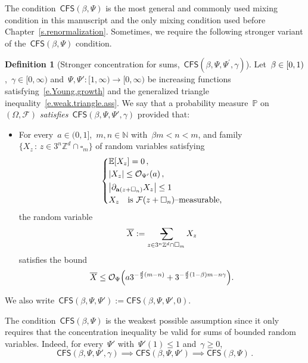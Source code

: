 \documentclass[11pt,twoside]{article} %
\makeatletter
\let\oldsquare\square %
\renewcommand{\square}{\oldsquare}
\numberwithin{equation}{section}
\theoremstyle{definition}
\newtheorem{definition}[theorem]{Definition}
\let\originalleft\left
\let\originalright\right
\renewcommand{\left}{\mathopen{}\mathclose\bgroup\originalleft}
\renewcommand{\right}{\aftergroup\egroup\originalright}
\newcommand*{\N}{\ensuremath{\mathbb{N}}}
\newcommand*{\Zd}{\ensuremath{\mathbb{Z}^d}}
\renewcommand{\a}{\mathbf{a}}
\newcommand{\cu}{\square}
\newcommand{\F}{\mathcal{F}}
\renewcommand{\P}{\mathbb{P}}
\newcommand{\E}{\mathbb{E}}
\renewcommand{\O}{\mathcal{O}}
\newcommand{\avsum}{\mathop{\mathpalette\avsuminner\relax}\displaylimits}
\newcommand\avsuminner[2]{%
  {\sbox0{$\m@th#1\sum$}%
   \vphantom{\usebox0}%
   \ooalign{%
     \hidewidth
     \smash{\,\rule[.23em]{8.8pt}{1.1pt} \relax}%
     \hidewidth\cr
   ~$\m@th#1\sum$\cr
   }%
  }%
}
\newcommand{\CFS}{\mathsf{CFS}}
\makeatother
\begin{document}
The condition~$\CFS(\beta,\Psi)$ is the most general and commonly used mixing condition in this manuscript and the only mixing condition used before Chapter~\ref{s.renormalization}. 
Sometimes, we require the following stronger variant of the~$\CFS(\beta,\Psi)$ condition. 
\begin{definition}[Stronger concentration for sums,~$\CFS(\beta,\Psi,\Psi^\prime,\gamma)$] \hspace{-2pt} 
\label{d.CFS.strong}
Let~$\beta \in \left[0,1\right)$,~$\gamma\in [0,\infty)$ and~$\Psi,\Psi':[1,\infty) \to [0,\infty)$ be increasing functions satisfying~\eqref{e.Young.growth} and the generalized triangle inequality~\eqref{e.weak.triangle.ass}.
We say that a probability measure~$\P$ on~$(\Omega,\F)$ \emph{satisfies~$\CFS(\beta,\Psi,\Psi',\gamma)$} provided that: 
\begin{itemize}
\item
For every~$a\in (0,1]$,~$m,n\in\N$ with~$\beta m < n<m$, and  family~$\{ X_z \,:\, z\in 3^n\Zd\cap \cu_m\}$ of random variables satisfying
\begin{equation} 
\label{e.CFS.strong.ass}
\left\{
\begin{aligned}
& \E\left[ X_z \right]=0\,, 
\\ & 
\left| X_z \right| \leq \O_{\Psi'}(a)\,,
\\ &
\left| \partial_{\a(z+\cu_n)} X_z\right| \leq 1
\\ & 
X_z \quad \mbox{is~$\F(z+\cu_n)$--measurable,}\\
\end{aligned}
\right.
\end{equation}
the random variable 
\begin{equation} 
\label{e.Z.strong.norm}
\overline{X}  :=  \avsum_{z\in 3^n\Zd\cap \cu_m}  X_z
\end{equation}
satisfies the bound
\begin{equation}
\label{e.strong.CFS}
\overline{X}
\leq
\O_{\Psi}\left( a 3^{-\frac d2(m-n)} 
+ 3^{-\frac d2(1-\beta)m - n\gamma} \right).
\end{equation}
\end{itemize}
We also write~$\CFS(\beta,\Psi,\Psi') := \CFS(\beta,\Psi,\Psi',0)$. 
\end{definition}

The condition~$\CFS(\beta,\Psi)$ is the weakest possible assumption since it only requires that the concentration inequality be valid for sums of bounded random variables. Indeed, for every~$\Psi'$ with~$\Psi'(1) \leq 1$ and~$\gamma\geq 0$,
\begin{equation}
\label{e.yes.weaker}
\CFS(\beta,\Psi,\Psi',\gamma) 
\implies
\CFS(\beta,\Psi,\Psi')
\implies
\CFS(\beta,\Psi)
\,.
\end{equation}
\end{document}
